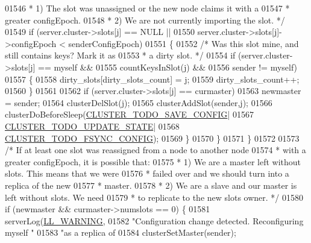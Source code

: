 \begin{DoxyCode}
{{{{{{{{{{{{{{{{{{{{{01546 \textcolor{comment}{             * 1) The slot was unassigned or the new node claims it with a}
01547 \textcolor{comment}{             *    greater configEpoch.}
01548 \textcolor{comment}{             * 2) We are not currently importing the slot. */}
01549             \textcolor{keywordflow}{if} (server.cluster->slots[j] == NULL ||
01550                 server.cluster->slots[j]->configEpoch < senderConfigEpoch)
01551             \{
01552                 \textcolor{comment}{/* Was this slot mine, and still contains keys? Mark it as}
01553 \textcolor{comment}{                 * a dirty slot. */}
01554                 \textcolor{keywordflow}{if} (server.cluster->slots[j] == myself &&
01555                     countKeysInSlot(j) &&
01556                     sender != myself)
01557                 \{
01558                     dirty\_slots[dirty\_slots\_count] = j;
01559                     dirty\_slots\_count++;
01560                 \}
01561 
01562                 \textcolor{keywordflow}{if} (server.cluster->slots[j] == curmaster)
01563                     newmaster = sender;
01564                 clusterDelSlot(j);
01565                 clusterAddSlot(sender,j);
01566                 clusterDoBeforeSleep(\hyperlink{cluster_8h_a0ae5ff08fbae3c655012b4de8bfc327d}{CLUSTER\_TODO\_SAVE\_CONFIG}|
01567                                      \hyperlink{cluster_8h_abea0d393cba342261e4a7e6fb745f388}{CLUSTER\_TODO\_UPDATE\_STATE}|
01568                                      \hyperlink{cluster_8h_accc9a00230cd04789db2398bb3ab715a}{CLUSTER\_TODO\_FSYNC\_CONFIG});
01569             \}
01570         \}
01571     \}
01572 
01573     \textcolor{comment}{/* If at least one slot was reassigned from a node to another node}
01574 \textcolor{comment}{     * with a greater configEpoch, it is possible that:}
01575 \textcolor{comment}{     * 1) We are a master left without slots. This means that we were}
01576 \textcolor{comment}{     *    failed over and we should turn into a replica of the new}
01577 \textcolor{comment}{     *    master.}
01578 \textcolor{comment}{     * 2) We are a slave and our master is left without slots. We need}
01579 \textcolor{comment}{     *    to replicate to the new slots owner. */}
01580     \textcolor{keywordflow}{if} (newmaster && curmaster->numslots == 0) \{
01581         serverLog(\hyperlink{server_8h_a31229b9334bba7d6be2a72970967a14b}{LL\_WARNING},
01582             \textcolor{stringliteral}{"Configuration change detected. Reconfiguring myself "}
01583             \textcolor{stringliteral}{"as a replica of %
01584         clusterSetMaster(sender);
}}}}}}}}}}}}}}}}}}}}}}
\end{DoxyCode}
